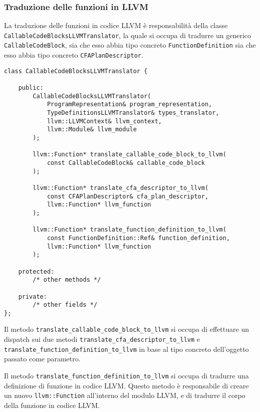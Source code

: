 \subsubsection{Traduzione delle funzioni in LLVM}
La traduzione delle funzioni in codice LLVM è responsabilità della classe 
\texttt{CallableCodeBlocksLLVMTranslator}, la quale si occupa di tradurre 
un generico \texttt{CallableCodeBlock}, sia che esso abbia tipo concreto 
\texttt{FunctionDefinition} sia che esso abbia tipo concreto 
\texttt{CFAPlanDescriptor}. \\

\vspace{0.5cm}
\begin{lstlisting}[frame=single]
class CallableCodeBlocksLLVMTranslator {
    
    public:
        CallableCodeBlocksLLVMTranslator(
            ProgramRepresentation& program_representation, 
            TypeDefinitionsLLVMTranslator& types_translator,
            llvm::LLVMContext& llvm_context,
            llvm::Module& llvm_module
        );

        llvm::Function* translate_callable_code_block_to_llvm(
            const CallableCodeBlock& callable_code_block
        );

        llvm::Function* translate_cfa_descriptor_to_llvm(
            const CFAPlanDescriptor& cfa_plan_descriptor, 
            llvm::Function* llvm_function
        );

        llvm::Function* translate_function_definition_to_llvm(
            const FunctionDefinition::Ref& function_definition, 
            llvm::Function* llvm_function
        );

    protected:
        /* other methods */

    private:
        /* other fields */
};

\end{lstlisting}
\vspace{0.5cm}

Il metodo \texttt{translate\_callable\_code\_block\_to\_llvm} si occupa di
effettuare un dispatch sui due metodi \texttt{translate\_cfa\_descriptor\_to\_llvm}
e \texttt{translate\_function\_definition\_to\_llvm} in base al tipo concreto
dell'oggetto passato come parametro. \\

\newpage

Il metodo \texttt{translate\_function\_definition\_to\_llvm} si occupa di tradurre
una definizione di funzione in codice LLVM. Questo metodo è responsabile di creare
un nuovo \texttt{llvm::Function} all'interno del modulo LLVM, e di tradurre il corpo
della funzione in codice LLVM. \\

